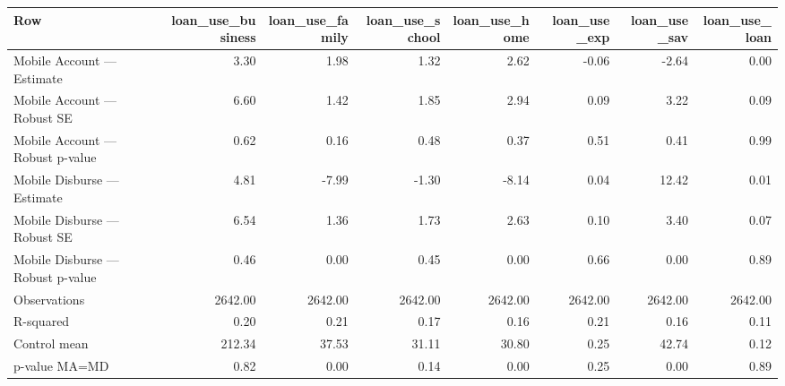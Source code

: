 
\begin{tabular}{lrrrrrrr}
\toprule
Row & loan\_use\_business & loan\_use\_family & loan\_use\_school & loan\_use\_home & loan\_use\_exp & loan\_use\_sav & loan\_use\_loan\\
\midrule
Mobile Account — Estimate & 3.30 & 1.98 & 1.32 & 2.62 & -0.06 & -2.64 & 0.00\\
Mobile Account — Robust SE & 6.60 & 1.42 & 1.85 & 2.94 & 0.09 & 3.22 & 0.09\\
Mobile Account — Robust p-value & 0.62 & 0.16 & 0.48 & 0.37 & 0.51 & 0.41 & 0.99\\
Mobile Disburse — Estimate & 4.81 & -7.99 & -1.30 & -8.14 & 0.04 & 12.42 & 0.01\\
Mobile Disburse — Robust SE & 6.54 & 1.36 & 1.73 & 2.63 & 0.10 & 3.40 & 0.07\\
\addlinespace
Mobile Disburse — Robust p-value & 0.46 & 0.00 & 0.45 & 0.00 & 0.66 & 0.00 & 0.89\\
Observations & 2642.00 & 2642.00 & 2642.00 & 2642.00 & 2642.00 & 2642.00 & 2642.00\\
R-squared & 0.20 & 0.21 & 0.17 & 0.16 & 0.21 & 0.16 & 0.11\\
Control mean & 212.34 & 37.53 & 31.11 & 30.80 & 0.25 & 42.74 & 0.12\\
p-value MA=MD & 0.82 & 0.00 & 0.14 & 0.00 & 0.25 & 0.00 & 0.89\\
\bottomrule
\end{tabular}
